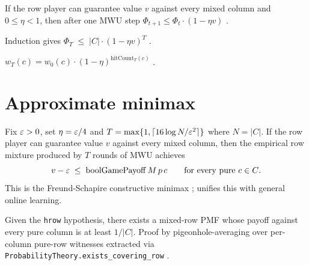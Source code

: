 \begin{thm}
\label{thm:potential-one-step}
  \leanok
If the row player can guarantee value $v$ against every mixed column
and $0 \le \eta < 1$, then after one MWU step
$\Phi_{t+1} \le \Phi_t \cdot (1 - \eta v)$
\cite[Cor.~2.2]{arora2012multiplicative}.
\end{thm}

\begin{thm}
\label{thm:potential-T-bound}
  \leanok
Induction gives $\Phi_T \;\le\; |C| \cdot (1 - \eta v)^T$
\cite[Thm~2.1]{arora2012multiplicative}.
\end{thm}

\begin{thm}
\label{thm:mwu-weight-eq-pow-hitCount}
  \leanok
$w_T(c) = w_0(c) \cdot (1 - \eta)^{\mathrm{hitCount}_T(c)}$
\cite[eq.~(2)]{freund1997}.
\end{thm}

\section{Approximate minimax}\label{sec:approx-minimax}

\begin{thm}
\label{thm:mwu-approx-minimax}
  \leanok
Fix $\varepsilon > 0$, set $\eta = \varepsilon/4$ and
$T = \max\{1, \lceil 16 \log N / \varepsilon^2 \rceil \}$ where $N = |C|$.
If the row player can guarantee value $v$ against every mixed
column, then the empirical row mixture produced by $T$ rounds of MWU
achieves
\[
  v - \varepsilon \;\le\; \mathrm{boolGamePayoff}\,M\,p\,c
  \qquad\text{for every pure $c \in C$.}
\]
This is the Freund-Schapire constructive minimax
\cite[Thm 3]{freund1999games}; \cite[\S3.1]{arora2012multiplicative}
unifies this with general online learning.
\end{thm}

\begin{thm}
\label{thm:covering-minimax}
  \leanok
Given the \texttt{hrow} hypothesis, there exists a mixed-row PMF
whose payoff against every pure column is at least $1 / |C|$. Proof
by pigeonhole-averaging over per-column pure-row witnesses extracted
via \texttt{ProbabilityTheory.exists\_covering\_row}
\cite{freund1999games}.
\end{thm}

